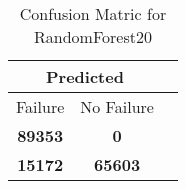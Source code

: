 \begin{table}[] 
\caption{Confusion Matric for RandomForest20} 
\label{Table: Prediction Accuracy-DMDRandomForest20OnlySunEKF-ignoreReflectionperfectNoFailurePrediction-Reflection} 
\centering 
\begin{tabular} 
 {@{}ccc@{}} 
\toprule 
\multicolumn{2}{c}{\textbf{Predicted}}
 \\ \midrule 
\multicolumn{1}{|c|}{Failure} & 
\multicolumn{1}{c|}{No Failure}
 \\ \midrule 
\multicolumn{1}{|c|}{\color{green}\textbf{89353}} & 
\multicolumn{1}{c|}{\color{red}\textbf{0}}
 \\ \midrule 
\multicolumn{1}{|c|}{\color{red}\textbf{15172}} & 
\multicolumn{1}{c|}{\color{green}\textbf{65603}}
 \\ \bottomrule 
\end{tabular} 
\end{table} 
